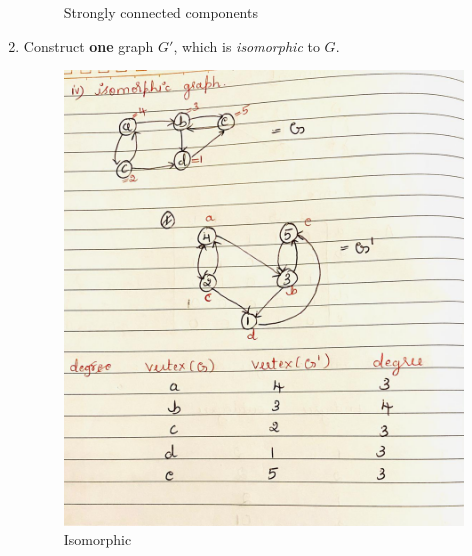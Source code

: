 \documentclass{resources/WeSTassignment}
\begin{document}
\begin{enumerate}
\begin{figure}[ht]
    \caption{Strongly connected components}
    \label{fig:Strongly connected components}
\end{figure}
    \item Construct \textbf{one} graph $G'$, which is \emph{isomorphic} to $G$.
    \begin{figure}[ht]
    \centering
    \includegraphics[scale=0.4]{./resources/2.4.jpeg}
    \caption{Isomorphic}
    \label{fig:Isomorphic}
\end{figure}
\end{enumerate}
\newpage
\end{document}
